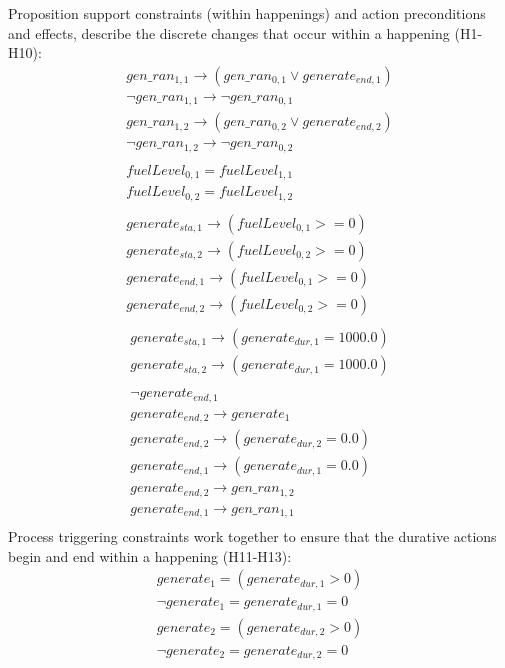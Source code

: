 \noindent Proposition support constraints (within happenings) and action preconditions and effects, describe the discrete changes that occur within a happening (H1-H10):
$$
\begin{array}{l}
gen\_ran_{1,1} \rightarrow (gen\_ran_{0,1} \vee generate_{end,1}) \\
\neg gen\_ran_{1,1} \rightarrow \neg gen\_ran_{0,1} \\
gen\_ran_{1,2} \rightarrow (gen\_ran_{0,2} \vee generate_{end,2}) \\
\neg gen\_ran_{1,2} \rightarrow \neg gen\_ran_{0,2} \\
\\
fuelLevel_{0,1} = fuelLevel_{1,1} \\
fuelLevel_{0,2} = fuelLevel_{1,2} \\
\\
generate_{sta,1} \rightarrow (fuelLevel_{0,1} >= 0) \\
generate_{sta,2} \rightarrow (fuelLevel_{0,2} >= 0) \\
generate_{end,1} \rightarrow (fuelLevel_{0,1} >= 0) \\
generate_{end,2} \rightarrow (fuelLevel_{0,2} >= 0) \\
\end{array}
$$
$$
\begin{array}{l}
generate_{sta,1} \rightarrow (generate_{dur,1} = 1000.0) \\
generate_{sta,2} \rightarrow (generate_{dur,1} = 1000.0) \\
\\
\neg generate_{end,1} \\
generate_{end,2} \rightarrow generate_1 \\
generate_{end,2} \rightarrow (generate_{dur,2} = 0.0) \\
generate_{end,1} \rightarrow (generate_{dur,1} = 0.0) \\
generate_{end,2} \rightarrow gen\_ran_{1,2} \\
generate_{end,1} \rightarrow gen\_ran_{1,1} \\
\end{array}
$$
Process triggering constraints work together to ensure that the durative actions begin and end within a happening (H11-H13):
$$
\begin{array}{l}
generate_1 = (generate_{dur,1} > 0) \\
\neg generate_1 = generate_{dur,1} = 0 \\
generate_2 = (generate_{dur,2} > 0) \\
\neg generate_2 = generate_{dur,2} = 0 \\
\end{array}
$$
